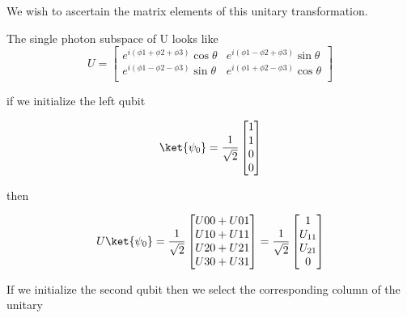We wish to ascertain the matrix elements of this unitary transformation.


The single photon subspace of U looks like
\begin{equation}
    U=
    \begin{bmatrix}
        e^{ i (\phi{1} + \phi{2} + \phi{3})}\cos{\theta} & e^{ i (\phi{1} - \phi{2} + \phi{3})}\sin{\theta} \\
        e^{ i (\phi{1} - \phi{2} - \phi{3})}\sin{\theta} & e^{ i (\phi{1} + \phi{2} - \phi{3})}\cos{\theta} \\
    \end{bmatrix}
\end{equation}


if we initialize the left qubit

\begin{equation}
    \ket{\psi_0}=\frac{1}{\sqrt{2}}
    \begin{bmatrix}
        1 \\
        1 \\
        0 \\
        0 \\
    \end{bmatrix}
\end{equation}

then

\begin{equation}
    U\ket{\psi_0} =
    \frac{1}{\sqrt{2}}
    \begin{bmatrix}
        U00 + U01 \\
        U10 + U11 \\
        U20 + U21 \\
        U30 + U31 \\
    \end{bmatrix}
    =
    \frac{1}{\sqrt{2}}
    \begin{bmatrix}
        1 \\
        U_{11} \\
        U_{21} \\
        0 \\
    \end{bmatrix}
\end{equation}

If we initialize the second qubit then we select the corresponding column of the unitary

